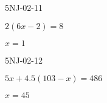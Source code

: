 \begin{defproblem}{5NJ-02-11}%
\begin{onlyproblem}%
$2(6 x-2)=8$

\end{onlyproblem}%
\begin{onlysolution}%
$x=1$

\end{onlysolution}%
\end{defproblem}




\begin{defproblem}{5NJ-02-12}%
\begin{onlyproblem}%
$5 x+4.5(103-x)=486$

\end{onlyproblem}%
\begin{onlysolution}%
$x=45$

\end{onlysolution}%
\end{defproblem}




